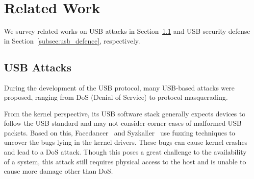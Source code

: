 \section{Related Work}
\label{sec:related_work}

We survey related works on USB attacks in Section~\ref{subsec:usb_attack} and
USB security defense in Section~\ref{subsec:usb_defence}, respectively.

\subsection{USB Attacks}
\label{subsec:usb_attack}

During the development of the USB protocol, many USB-based attacks were proposed,
ranging from DoS (Denial of Service) to protocol masquerading.

From the kernel perspective, its USB software stack generally expects devices
to follow the USB standard and may not consider corner cases of malformed USB
packets. Based on this, Facedancer~\cite{facedancer} and
Syzkaller~\cite{syzkaller} use fuzzing techniques to uncover the bugs lying in
the kernel drivers. These bugs can cause kernel crashes and lead to a DoS attack.
Though this poses a great challenge to the availability of a system, this
attack still requires physical access to the host and is unable to cause more
damage other than DoS.

